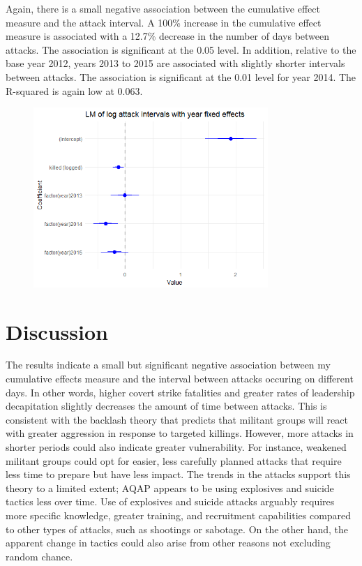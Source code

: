 \documentclass[letterpaper,12pt]{article}
\theoremstyle{definition}
\begin{document}
Again, there is a small negative association between the cumulative effect measure and the attack interval. A 100\% increase in the cumulative effect measure is associated with a 12.7\% decrease in the number of days between attacks. The association is significant at the 0.05 level. In addition, relative to the base year 2012, years 2013 to 2015 are associated with slightly shorter intervals between attacks. The association is significant at the 0.01 level for year 2014. The R-squared is again low at 0.063.

\begin{figure}[htb!]
  \includegraphics[width=3.5in]{coef_plot.png}
\end{figure}

\section{Discussion}

The results indicate a small but significant negative association between my cumulative effects measure and the interval between attacks occuring on different days. In other words, higher covert strike fatalities and greater rates of leadership decapitation slightly decreases the amount of time between attacks. This is consistent with the backlash theory that predicts that militant groups will react with greater aggression in response to targeted killings. However, more attacks in shorter periods could also indicate greater vulnerability. For instance, weakened militant groups could opt for easier, less carefully planned attacks that require less time to prepare but have less impact. The trends in the attacks support this theory to a limited extent; AQAP appears to be using explosives and suicide tactics less over time. Use of explosives and suicide attacks arguably requires more specific knowledge, greater training, and recruitment capabilities compared to other types of attacks, such as shootings or sabotage. On the other hand, the apparent change in tactics could also arise from other reasons not excluding random chance.
\end{document}
